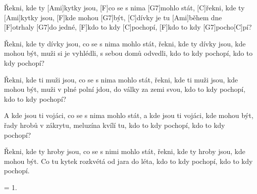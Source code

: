 
\sloka
[C]Řekni, kde ty [Ami]kytky jsou, [F]co se s nima [G7]mohlo stát,
[C]řekni, kde ty [Ami]kytky jsou, [F]kde mohou [G7]být,
[C]dívky je tu [Ami]během dne [F]otrhaly [G7]do jedné,
[F]kdo to kdy [C]pochopí, [F]kdo to kdy [G7]pocho[C]pí?

\sloka
Řekni, kde ty dívky jsou, co se s nima mohlo stát,
řekni, kde ty dívky jsou, kde mohou být,
muži si je vyhlédli, s sebou domů odvedli,
kdo to kdy pochopí, kdo to kdy pochopí?

\sloka
Řekni, kde ti muži jsou, co se s nima mohlo stát,
řekni, kde ti muži jsou, kde mohou být,
muži v plné polní jdou, do války za zemi svou,
kdo to kdy pochopí, kdo to kdy pochopí?

\sloka
A kde jsou ti vojáci, co se s nima mohlo stát,
a kde jsou ti vojáci, kde mohou být,
řady hrobů v zákrytu, meluzína kvílí tu,
kdo to kdy pochopí, kdo to kdy pochopí?

\sloka
Řekni, kde ty hroby jsou, co se s nimi mohlo stát,
řekni, kde ty hroby jsou, kde mohou být.
Co tu kytek rozkvétá od jara do léta,
kdo to kdy pochopí, kdo to kdy pochopí.

\sloka
= 1.
